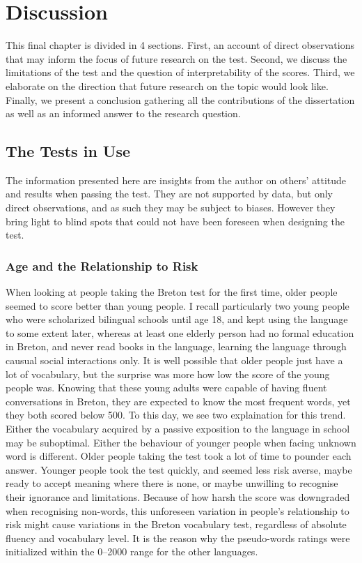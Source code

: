 \chapter{Discussion}
This final chapter is divided in 4 sections. First, an account of direct observations that may inform the focus of future research on the test. Second, we discuss the limitations of the test and the question of interpretability of the scores. Third, we elaborate on the direction that future research on the topic would look like. Finally, we present a conclusion gathering all the contributions of the dissertation as well as an informed answer to the research question.

\section{The Tests in Use}
The information presented here are insights from the author on others' attitude and results when passing the test. They are not supported by data, but only direct observations, and as such they may be subject to biases. However they bring light to blind spots that could not have been foreseen when designing the test.

\subsection{Age and the Relationship to Risk}
When looking at people taking the Breton test for the first time, older people seemed to score better than young people. I recall particularly two young people who were scholarized bilingual schools until age 18, and kept using the language to some extent later, whereas at least one elderly person had no formal education in Breton, and never read books in the language, learning the language through causual social interactions only. It is well possible that older people just have a lot of vocabulary, but the surprise was more how low the score of the young people was. Knowing that these young adults were capable of having fluent conversations in Breton, they are expected to know the most frequent words, yet they both scored below 500. To this day, we see two explaination for this trend. Either the vocabulary acquired by a passive exposition to the language in school may be suboptimal. Either the behaviour of younger people when facing unknown word is different. Older people taking the test took a lot of time to pounder each answer. Younger people took the test quickly, and seemed less risk averse, maybe ready to accept meaning where there is none, or maybe unwilling to recognise their ignorance and limitations. Because of how harsh the score was downgraded when recognising non-words, this unforeseen variation in people's relationship to risk might cause variations in the Breton vocabulary test, regardless of absolute fluency and vocabulary level. It is the reason why the pseudo-words ratings were initialized within the 0–2000 range for the other languages.

